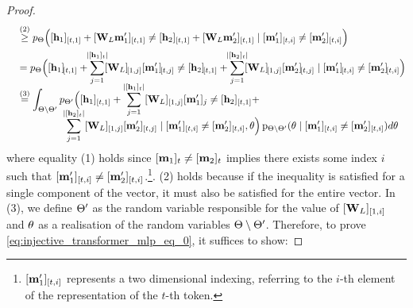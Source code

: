 \begin{proof}
\begin{subequations}
\begin{align}
        &\quad\stackrel{(2)}{\geq}
        \prob_{\Parameters}\Big([\hiddenstates_1]_{[\tokenposition,1]}+[\mlpweights_{\nlayers}\MLP'_{1}]_{[\tokenposition,1]}\neq[\hiddenstates_2]_{[\tokenposition,1]}+[\mlpweights_{\nlayers}\MLP'_{2}]_{[\tokenposition,1]}\mid [\MLP'_{1}]_{[\tokenposition,i]}\neq[\MLP'_{2}]_{[\tokenposition,i]} \Big) \\
        &\quad=
        \prob_{\Parameters}\Big([\hiddenstates_1]_{\![\tokenposition,1]}+
        \!\!\sum_{j=1}^{|[\hiddenstates_1]_\tokenposition|}\!\![\mlpweights_{\nlayers}]_{\![1,j]}[\MLP'_{1}]_{\![\tokenposition,j]}\neq [\hiddenstates_2]_{\![\tokenposition,1]}+
        \!\!\sum_{j=1}^{|[\hiddenstates_2]_\tokenposition|}\!\![\mlpweights_{\nlayers}]_{\![1,j]}[\MLP'_{2}]_{\![\tokenposition,j]}\mid [\MLP'_{1}]_{\![\tokenposition,i]}\neq[\MLP'_{2}]_{\![\tokenposition,i]} \Big) \\
        &\quad \stackrel{(3)}{=} \int_{\Parameters\setminus\Parameters'}\prob_{\Parameters'}\Big([\hiddenstates_1]_{[\tokenposition,1]}+\smash{\sum_{j=1}^{|[\hiddenstates_1]_\tokenposition|}}[\mlpweights_{\nlayers}]_{[1,j]}[\MLP'_{1}]_j\neq [\hiddenstates_2]_{[\tokenposition,1]}+\\
        &\,\qquad\qquad\phantom{\sum_{j}} \smash{\sum_{j=1}^{|[\hiddenstates_2]_\tokenposition|}}[\mlpweights_{\nlayers}]_{[1,j]}[\MLP'_{2}]_{[\tokenposition,j]} \mid [\MLP'_{1}]_{[\tokenposition,i]}\neq[\MLP'_{2}]_{[\tokenposition,i]},\parameters\Big)\, \pdfun{\Parameters\setminus\Parameters'}(\parameters\mid [\MLP'_{1}]_{[\tokenposition,i]}\neq[\MLP'_{2}]_{[\tokenposition,i]}) d\parameters \nonumber
    \end{align}
    \end{subequations}
    where equality (1) holds since $[\mathbf{m}_{1}]_t\neq[\mathbf{m}_{2}]_t$ implies there exists some index $i$ such that $[\mathbf{m}'_{1}]_{[t,i]}\neq[\mathbf{m}'_{2}]_{[t,i]}$.\footnote{$[\mathbf{m}'_{1}]_{[t,i]}$ represents a two dimensional indexing, referring to the $i$-th element of the representation of the $t$-th token.}. (2) holds because if the inequality is satisfied for a single component of the vector, it must also be satisfied for the entire vector.
    In (3), we define $\Theta'$ as the random variable responsible for the value of $[\mathbf{W}_{L}]_{[1,i]}$  and $\theta$ as a realisation of the random variables $\Theta\setminus\Theta'$.
    Therefore, to prove \cref{eq:injective_transformer_mlp_eq_0}, it suffices to show:

\end{proof}
